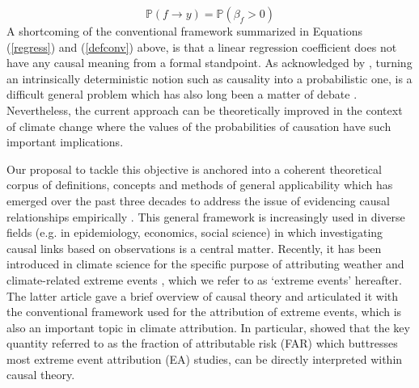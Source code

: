 \documentclass[12pt]{article}
\newcommand{\Proba}{\mathbb P}
\begin{document}
\begin{equation}\label{defconv}
\Proba(f\rightarrow y) = \Proba(\beta_f>0)
\end{equation}
A shortcoming of the conventional framework summarized in Equations (\ref{regress}) and (\ref{defconv}) above, is that a linear regression coefficient does not have any causal meaning from a formal standpoint. %
As acknowledged by \cite{Pearl09}, turning an intrinsically deterministic notion such as causality into a probabilistic one, is a difficult general problem which has also long been a matter of debate \citep{Sim51,Sup70,Mel95}. %
Nevertheless, the current approach can be theoretically improved in the context of climate change where the values of the probabilities of causation have such important implications. 

Our proposal to tackle this objective is anchored into a coherent theoretical corpus of definitions, concepts and methods of general applicability which has emerged over the past three decades to address the issue of evidencing causal relationships empirically \citep{Pearl09}. This general framework is increasingly used in diverse fields (e.g. in epidemiology, economics, social science) in which investigating causal links based on observations is a central matter. Recently, it has been introduced in climate science for the specific purpose of attributing weather and climate-related extreme events \citep{HPONG15}, which we refer to as `extreme events' hereafter. The latter article gave a brief overview of causal theory and articulated it with the conventional framework used for the attribution of extreme events, which is also an important topic in climate attribution. In particular, \cite{HPONG15} showed that the key quantity referred to as the fraction of attributable risk (FAR) \citep{All03,Stone05} which buttresses most extreme event attribution (EA) studies, can be directly interpreted within causal theory.
\end{document}
